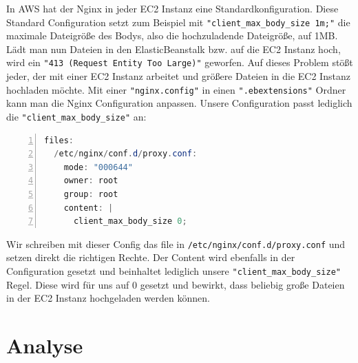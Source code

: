 \documentclass[a4paper, 12pt]{scrreprt}
\renewcommand\_{\textunderscore\allowbreak}
\begin{document}
In AWS hat der Nginx in jeder EC2 Instanz eine Standardkonfiguration. Diese Standard Configuration setzt zum Beispiel mit \lstinline|"client_max_body_size 1m;"| \cite{NGINX} die maximale Dateigröße des Bodys, also die hochzuladende Dateigröße, auf 1MB.\\
Lädt man nun Dateien in den ElasticBeanstalk bzw. auf die EC2 Instanz hoch, wird ein \lstinline|"413 (Request Entity Too Large)"| geworfen. Auf dieses Problem stößt jeder, der mit einer EC2 Instanz arbeitet und größere Dateien in die EC2 Instanz hochladen möchte.
Mit einer \lstinline|"nginx.config"| in einen \lstinline|".ebextensions"| Ordner kann man die Nginx Configuration anpassen. 
Unsere Configuration passt lediglich die \lstinline|"client_max_body_size"| an:\\
\begin{lstlisting}[xleftmargin=\parindent,numbers=left,numberstyle=\small,numbersep=8pt,frame=L,mathescape=true, basicstyle=\small, language=Java, lineskip={1.0pt}]
files:
  /etc/nginx/conf.d/proxy.conf:
    mode: "000644"
    owner: root
    group: root
    content: |
      client_max_body_size 0;
\end{lstlisting}
\bigskip
\noindent Wir schreiben mit dieser Config das file in \lstinline|/etc/nginx/conf.d/proxy.conf| und setzen direkt die richtigen Rechte. Der Content wird ebenfalls in der Configuration gesetzt und beinhaltet lediglich unsere \lstinline|"client_max_body_size"|  Regel. Diese wird für uns auf 0 gesetzt und bewirkt, dass beliebig große Dateien in der EC2 Instanz hochgeladen werden können.



\chapter{Analyse}
\end{document}
